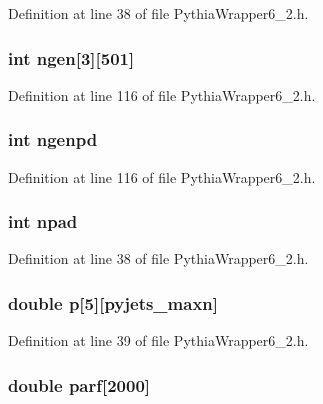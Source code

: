 Definition at line 38 of file Pythia\-Wrapper6\_\-2.h.
\subsubsection{\setlength{\rightskip}{0pt plus 5cm}int {\bf ngen}[3][501]}\label{PythiaWrapper6__2_8h_b6cfdc75a985515bb64ad1d2f60d834a}




Definition at line 116 of file Pythia\-Wrapper6\_\-2.h.
\subsubsection{\setlength{\rightskip}{0pt plus 5cm}int {\bf ngenpd}}\label{PythiaWrapper6__2_8h_acc239405f0dbe2c68b579839c03a395}




Definition at line 116 of file Pythia\-Wrapper6\_\-2.h.
\subsubsection{\setlength{\rightskip}{0pt plus 5cm}int {\bf npad}}\label{PythiaWrapper6__2_8h_ad92761fbbdc26c9f4a19000b8a472c6}




Definition at line 38 of file Pythia\-Wrapper6\_\-2.h.
\subsubsection{\setlength{\rightskip}{0pt plus 5cm}double {\bf p}[5][{\bf pyjets\_\-maxn}]}\label{PythiaWrapper6__2_8h_d391ea88e52cee16ef732a00ea497d5a}




Definition at line 39 of file Pythia\-Wrapper6\_\-2.h.
\subsubsection{\setlength{\rightskip}{0pt plus 5cm}double {\bf parf}[2000]}\label{PythiaWrapper6__2_8h_2187293022d9c4ab4081e477ac6633bb}




